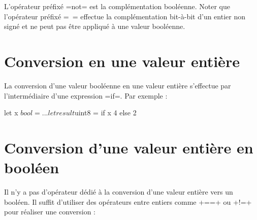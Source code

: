 L'opérateur préfixé \plm=not= est la complémentation booléenne. Noter que l'opérateur préfixé \plm=~= effectue la complémentation bit-à-bit d'un entier non signé et ne peut pas être appliqué à une valeur booléenne.

\section{Conversion en une valeur entière}

La conversion d'une valeur booléenne en une valeur entière s'effectue par l'intermédiaire d'une expression \plm=if=. Par exemple :

\begin{PLM}
let x $bool = ...
let result $uint8 = if x { 4 }else{ 2 }
\end{PLM}


\section{Conversion d'une valeur entière en booléen}

Il n'y a pas d'opérateur dédié à la conversion d'une valeur entière vers un booléen. Il suffit d'utiliser des opérateurs entre entiers comme \plm+==+ ou \plm+!=+ pour réaliser une conversion :



